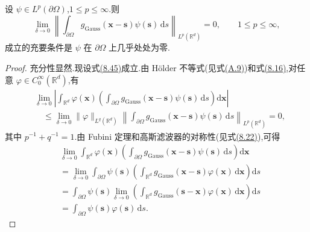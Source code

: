\begin{theorem}
\label{thm:gaussian-commutation-Lp-vanishing}
设 $\psi\in L^p(\partial\Omega)$,$1\le p\le\infty$.则
\begin{equation}\label{eq:gaussian-commutation-Lp-limit}
 \lim_{\delta\to0}
  \left\|\int_{\partial\Omega}
   g_{\mathrm{Gauss}}(\bm{x}-\bm{s})\psi(\bm{s})\,\mathrm{d}s
  \right\|_{L^p(\mathbb{R}^d)}=0,
 \qquad 1\le p\le\infty,
\end{equation}
成立的充要条件是 $\psi$ 在 $\partial\Omega$ 上几乎处处为零.
\end{theorem}
\begin{proof}
充分性显然.现设式\hyperref[eq:gaussian-commutation-Lp-limit]{(8.45)}成立.由 Hölder 不等式(见式\hyperref[eq:appendix-a-9]{(A.9)})和式\hyperref[eq:gaussian-filter-approximate-identity]{(8.16)},对任意 $\varphi\in C_0^\infty(\mathbb{R}^d)$,有
\begin{equation}\label{eq:gaussian-commutation-duality}
\begin{aligned}
 &\lim_{\delta\to0}
  \left|\int_{\mathbb{R}^d}
    \varphi(\bm{x})
    \left(\int_{\partial\Omega}
      g_{\mathrm{Gauss}}(\bm{x}-\bm{s})\psi(\bm{s})\,\mathrm{d}s
    \right)\mathrm{d}\bm{x}\right|\\
 &\quad\le \lim_{\delta\to0}
   \|\varphi\|_{L^q(\mathbb{R}^d)}
   \left\|\int_{\partial\Omega}
      g_{\mathrm{Gauss}}(\bm{x}-\bm{s})\psi(\bm{s})\,\mathrm{d}s
   \right\|_{L^p(\mathbb{R}^d)}=0,
\end{aligned}
\end{equation}
其中 $p^{-1}+q^{-1}=1$.由 Fubini 定理和高斯滤波器的对称性(见式\hyperref[eq:gaussian-filter-symmetry]{(8.22)}),可得
\[
\begin{aligned}
 &\lim_{\delta\to0}\int_{\mathbb{R}^d}
    \varphi(\bm{x})
    \left(\int_{\partial\Omega}
      g_{\mathrm{Gauss}}(\bm{x}-\bm{s})\psi(\bm{s})\,\mathrm{d}s
    \right)\mathrm{d}\bm{x}\\
 &=\lim_{\delta\to0}\int_{\partial\Omega}\psi(\bm{s})
    \left(\int_{\mathbb{R}^d}
      g_{\mathrm{Gauss}}(\bm{x}-\bm{s})\varphi(\bm{x})
      \,\mathrm{d}\bm{x}\right)\mathrm{d}s\\
 &=\int_{\partial\Omega}\psi(\bm{s})
    \lim_{\delta\to0}\left(\int_{\mathbb{R}^d}
      g_{\mathrm{Gauss}}(\bm{s}-\bm{x})\varphi(\bm{x})
      \,\mathrm{d}\bm{x}\right)\mathrm{d}s\\
 &=\int_{\partial\Omega}\psi(\bm{s})\varphi(\bm{s})\,\mathrm{d}s.
\end{aligned}
\]
\end{proof}
